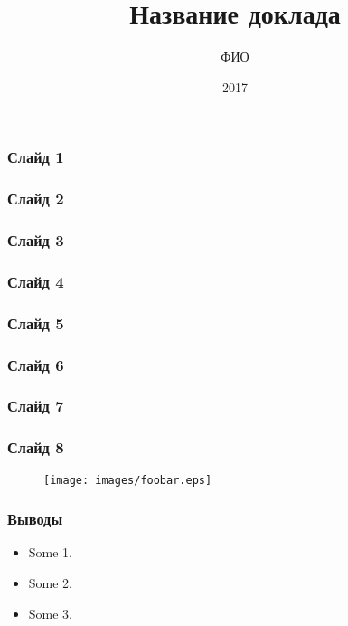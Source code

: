 \documentclass[xcolor=table]{beamer}
\title{Название доклада}
\author{ФИО}
\institute{Санкт-Петербургский государственный университет}
\date{2017}
\begin{document}
 
\frame{\titlepage}

\begin{frame}
	\frametitle{Слайд 1}
\end{frame}

\begin{frame}
	\frametitle{Слайд 2}
\end{frame}

\begin{frame}
	\frametitle{Слайд 3}
\end{frame}

\begin{frame}
	\frametitle{Слайд 4}
\end{frame}

\begin{frame}
	\frametitle{Слайд 5}
\end{frame}

\begin{frame}
	\frametitle{Слайд 6}
\end{frame}

\begin{frame}
	\frametitle{Слайд 7}
\end{frame}

\begin{frame}
	\frametitle{Слайд 8}
	\begin{figure}
	    \centering
	    \texttt{[image: images/foobar.eps]}
	\end{figure}
\end{frame}  

\begin{frame}
	\frametitle{Выводы}
	\begin{itemize} 
		\item Some 1.
		\item Some 2.
		\item Some 3.
	\end{itemize}
\end{frame}
\end{document}
